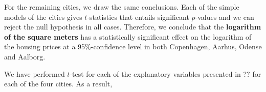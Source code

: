 For the remaining cities, we draw the same conclusions. 
Each of the simple models of the cities gives $t$-statistics that entails significant $p$-values and we can reject the null hypothesis in all cases. 
Therefore, we conclude that the \textbf{logarithm of the square meters} has a statistically significant effect on the logarithm of the housing prices at a 95\%-confidence level in both Copenhagen, Aarhus, Odense and Aalborg. 

We have performed $t$-test for each of the explanatory variables presented in ?? for each of the four cities. As a result, 








